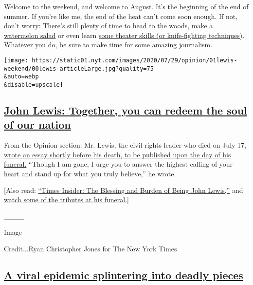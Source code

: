 Welcome to the weekend, and welcome to August. It's the beginning of the
end of summer. If you're like me, the end of the heat can't come soon
enough. If not, don't worry: There's still plenty of time to
\href{https://www.nytimes.com/2020/07/29/at-home/newsletter.html}{head
to the woods},
\href{https://www.nytimes.com/2020/07/29/dining/watermelon-salad-recipe.html}{make
a watermelon salad} or even learn
\href{https://www.nytimes.com/2020/07/30/theater/theater-classes-at-home.html}{some
theater skills (or knife-fighting techniques)}. Whatever you do, be sure
to make time for some amazing journalism.

\texttt{[image: https://static01.nyt.com/images/2020/07/29/opinion/01lewis-weekend/00lewis-articleLarge.jpg?quality=75\\\&auto=webp\\\&disable=upscale]}

\hypertarget{john-lewis-together-you-can-redeem-the-soul-of-our-nation}{%
\subsection{\texorpdfstring{\href{https://www.nytimes.com/2020/07/30/opinion/john-lewis-civil-rights-america.html}{John
Lewis: Together, you can redeem the soul of our
nation}}{John Lewis: Together, you can redeem the soul of our nation}}\label{john-lewis-together-you-can-redeem-the-soul-of-our-nation}}

From the Opinion section: Mr. Lewis, the civil rights leader who died on
July 17,
\href{https://www.nytimes.com/2020/07/30/opinion/john-lewis-civil-rights-america.html}{wrote
an essay shortly before his death, to be published upon the day of his
funeral.} ``Though I am gone, I urge you to answer the highest calling
of your heart and stand up for what you truly believe,'' he wrote.

{[}Also read:
\href{https://www.nytimes.com/2020/07/23/insider/john-lewis-memory.html}{``Times
Insider: The Blessing and Burden of Being John Lewis,''} and
\href{https://www.nytimes.com/video/us/politics/100000007264823/john-lewis-funeral.html}{watch
some of the tributes at his funeral.}{]}

\_\_\_\_

Image

Credit...Ryan Christopher Jones for The New York Times

\hypertarget{a-viral-epidemic-splintering-into-deadly-pieces}{%
\subsection{\texorpdfstring{\href{https://www.nytimes.com/2020/07/29/health/coronavirus-future-america.html}{A
viral epidemic splintering into deadly
pieces}}{A viral epidemic splintering into deadly pieces}}\label{a-viral-epidemic-splintering-into-deadly-pieces}}


